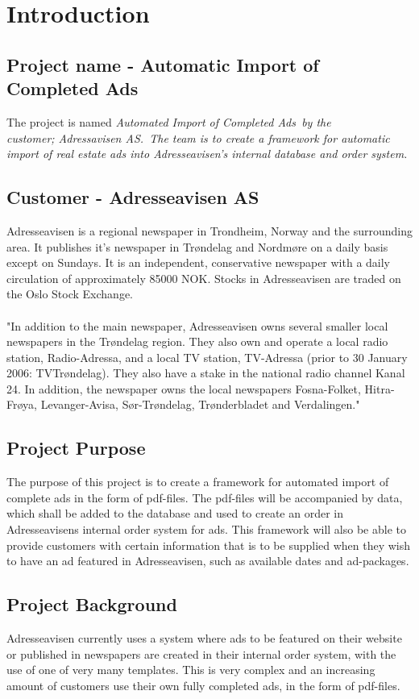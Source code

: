 \section{Introduction}
\subsection{Project name - Automatic Import of Completed Ads}
The project is named \em Automated Import of Completed Ads\em \ by the \\
customer; \em Adressavisen AS.\em \ The team is to create a framework for automatic import of real estate ads into Adresseavisen's internal database and order system.
\subsection{Customer - Adresseavisen AS}
Adresseavisen is a regional newspaper in Trondheim, Norway and the surrounding area. It publishes it's newspaper in Trøndelag and Nordmøre on a daily basis except on Sundays. It is an independent, conservative newspaper with a daily circulation of approximately 85000 NOK. 
Stocks in Adresseavisen are traded on the Oslo Stock Exchange.\\
\\
"In addition to the main newspaper, Adresseavisen owns several smaller local newspapers in the Trøndelag region. They also own and operate a local radio station, Radio-Adressa, and a local TV station, TV-Adressa (prior to 30 January 2006: TVTrøndelag). They also have a stake in the national radio channel Kanal 24. In addition, the newspaper owns the local newspapers Fosna-Folket, Hitra-Frøya, Levanger-Avisa, Sør-Trøndelag, Trønderbladet and Verdalingen." \cite{adressaWiki}

\subsection{Project Purpose}
The purpose of this project is to create a framework for automated import of complete ads in the form of pdf-files. The pdf-files will be accompanied by data, which shall be added to the database and used to create an order in Adresseavisens internal order system for ads. This framework will also be able to provide customers with certain information that is to be supplied when they wish to have an ad featured in Adresseavisen, such as available dates and ad-packages.

\subsection{Project Background}
Adresseavisen currently uses a system where ads to be featured on their website or published in newspapers are created in their internal order system, with the use of one of very many templates. This is very complex and an increasing amount of customers use their own fully completed ads, in the form of pdf-files.

